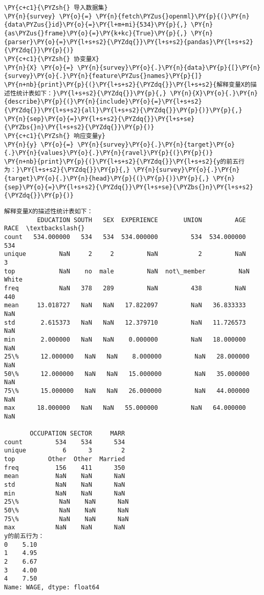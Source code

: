 \begin{Verbatim}[commandchars=\\\{\}]
\PY{c+c1}{\PYZsh{} 导入数据集}
\PY{n}{survey} \PY{o}{=} \PY{n}{fetch\PYZus{}openml}\PY{p}{(}\PY{n}{data\PYZus{}id}\PY{o}{=}\PY{l+m+mi}{534}\PY{p}{,} \PY{n}{as\PYZus{}frame}\PY{o}{=}\PY{k+kc}{True}\PY{p}{,} \PY{n}{parser}\PY{o}{=}\PY{l+s+s2}{\PYZdq{}}\PY{l+s+s2}{pandas}\PY{l+s+s2}{\PYZdq{}}\PY{p}{)}
\PY{c+c1}{\PYZsh{} 协变量X}
\PY{n}{X} \PY{o}{=} \PY{n}{survey}\PY{o}{.}\PY{n}{data}\PY{p}{[}\PY{n}{survey}\PY{o}{.}\PY{n}{feature\PYZus{}names}\PY{p}{]}
\PY{n+nb}{print}\PY{p}{(}\PY{l+s+s2}{\PYZdq{}}\PY{l+s+s2}{解释变量X的描述性统计表如下：}\PY{l+s+s2}{\PYZdq{}}\PY{p}{,} \PY{n}{X}\PY{o}{.}\PY{n}{describe}\PY{p}{(}\PY{n}{include}\PY{o}{=}\PY{l+s+s2}{\PYZdq{}}\PY{l+s+s2}{all}\PY{l+s+s2}{\PYZdq{}}\PY{p}{)}\PY{p}{,} \PY{n}{sep}\PY{o}{=}\PY{l+s+s2}{\PYZdq{}}\PY{l+s+se}{\PYZbs{}n}\PY{l+s+s2}{\PYZdq{}}\PY{p}{)}
\PY{c+c1}{\PYZsh{} 响应变量y}
\PY{n}{y} \PY{o}{=} \PY{n}{survey}\PY{o}{.}\PY{n}{target}\PY{o}{.}\PY{n}{values}\PY{o}{.}\PY{n}{ravel}\PY{p}{(}\PY{p}{)}
\PY{n+nb}{print}\PY{p}{(}\PY{l+s+s2}{\PYZdq{}}\PY{l+s+s2}{y的前五行为：}\PY{l+s+s2}{\PYZdq{}}\PY{p}{,} \PY{n}{survey}\PY{o}{.}\PY{n}{target}\PY{o}{.}\PY{n}{head}\PY{p}{(}\PY{p}{)}\PY{p}{,} \PY{n}{sep}\PY{o}{=}\PY{l+s+s2}{\PYZdq{}}\PY{l+s+se}{\PYZbs{}n}\PY{l+s+s2}{\PYZdq{}}\PY{p}{)}
\end{Verbatim}

\begin{Verbatim}[commandchars=\\\{\}]
解释变量X的描述性统计表如下：
         EDUCATION SOUTH   SEX  EXPERIENCE       UNION         AGE   RACE  \textbackslash{}
count   534.000000   534   534  534.000000         534  534.000000    534
unique         NaN     2     2         NaN           2         NaN      3
top            NaN    no  male         NaN  not\_member         NaN  White
freq           NaN   378   289         NaN         438         NaN    440
mean     13.018727   NaN   NaN   17.822097         NaN   36.833333    NaN
std       2.615373   NaN   NaN   12.379710         NaN   11.726573    NaN
min       2.000000   NaN   NaN    0.000000         NaN   18.000000    NaN
25\%      12.000000   NaN   NaN    8.000000         NaN   28.000000    NaN
50\%      12.000000   NaN   NaN   15.000000         NaN   35.000000    NaN
75\%      15.000000   NaN   NaN   26.000000         NaN   44.000000    NaN
max      18.000000   NaN   NaN   55.000000         NaN   64.000000    NaN

       OCCUPATION SECTOR     MARR
count         534    534      534
unique          6      3        2
top         Other  Other  Married
freq          156    411      350
mean          NaN    NaN      NaN
std           NaN    NaN      NaN
min           NaN    NaN      NaN
25\%           NaN    NaN      NaN
50\%           NaN    NaN      NaN
75\%           NaN    NaN      NaN
max           NaN    NaN      NaN
y的前五行为：
0    5.10
1    4.95
2    6.67
3    4.00
4    7.50
Name: WAGE, dtype: float64
\end{Verbatim}

